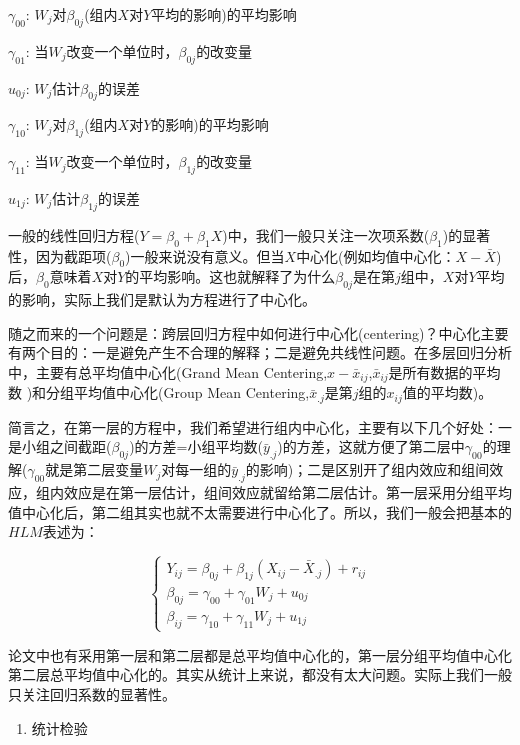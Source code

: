 \documentclass[
]{book}
\providecommand{\tightlist}{%
  \setlength{\itemsep}{0pt}\setlength{\parskip}{0pt}}
\begin{document}
\(\gamma_{00}\): \(W_j\)对\(\beta_{0j}\)(组内\(X\)对\(Y\)平均的影响)的平均影响

\(\gamma_{01}\): 当\(W_j\)改变一个单位时，\(\beta_{0j}\)的改变量

\(u_{0j}\): \(W_j\)估计\(\beta_{0j}\)的误差

\(\gamma_{10}\): \(W_j\)对\(\beta_{1j}\)(组内\(X\)对\(Y\)的影响)的平均影响

\(\gamma_{11}\): 当\(W_j\)改变一个单位时，\(\beta_{1j}\)的改变量

\(u_{1j}\): \(W_j\)估计\(\beta_{1j}\)的误差

一般的线性回归方程(\(Y=\beta_0+\beta_1X\))中，我们一般只关注一次项系数(\(\beta_1\))的显著性，因为截距项(\(\beta_0\))一般来说没有意义。但当\(X\)中心化(例如均值中心化：\(X-\bar{X}\))后，\(\beta_0\)意味着\(X\)对\(Y\)的平均影响。这也就解释了为什么\(\beta_{0j}\)是在第\(j\)组中，\(X\)对\(Y\)平均的影响，实际上我们是默认为方程进行了中心化。

随之而来的一个问题是：跨层回归方程中如何进行中心化(centering)？中心化主要有两个目的：一是避免产生不合理的解释；二是避免共线性问题。在多层回归分析中，主要有总平均值中心化(Grand Mean Centering,\(x-\bar{x}_{ij}\),\(\bar{x}_{ij}\)是所有数据的平均数 )和分组平均值中心化(Group Mean Centering,\(\bar{x}_{.j}\)是第\(j\)组的\(x_{ij}\)值的平均数)。

简言之，在第一层的方程中，我们希望进行组内中心化，主要有以下几个好处：一是小组之间截距(\(\beta_{0j}\))的方差=小组平均数(\(\bar{y}_{.j}\))的方差，这就方便了第二层中\(\gamma_{00}\)的理解(\(\gamma_{00}\)就是第二层变量\(W_j\)对每一组的\(\bar{y}_{.j}\)的影响)；二是区别开了组内效应和组间效应，组内效应是在第一层估计，组间效应就留给第二层估计。第一层采用分组平均值中心化后，第二组其实也就不太需要进行中心化了。所以，我们一般会把基本的\(HLM\)表述为：

\[
\left\{ \begin{aligned} 
        Y_{ij} = \beta_{0j} + \beta_{1j}(X_{ij} - \bar{X}_{.j}) + r_{ij} \\
        \beta_{0j} = \gamma_{00} + \gamma_{01}W_j + u_{0j} \\
         \beta_{ij} = \gamma_{10} + \gamma_{11}W_j + u_{1j}   
\end{aligned} \right.
\]

论文中也有采用第一层和第二层都是总平均值中心化的，第一层分组平均值中心化第二层总平均值中心化的。其实从统计上来说，都没有太大问题。实际上我们一般只关注回归系数的显著性。

\begin{enumerate}
\def\labelenumi{\arabic{enumi}.}
\setcounter{enumi}{1}
\tightlist
\item
  统计检验
\end{enumerate}
\end{document}
